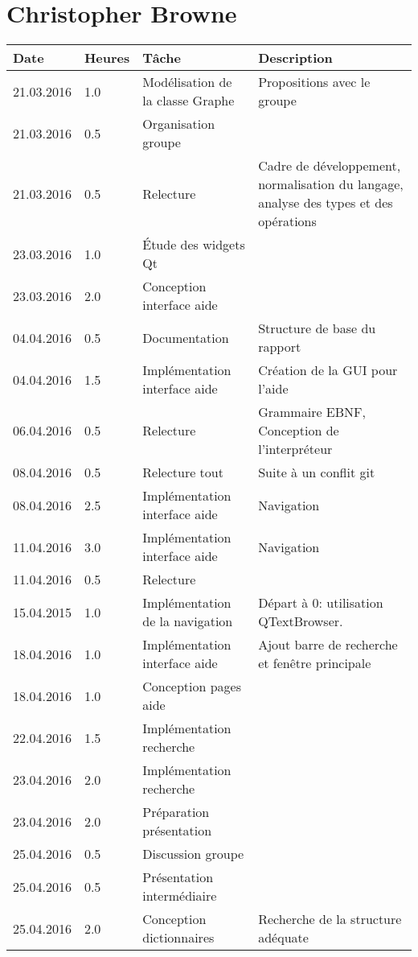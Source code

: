 \documentclass[french]{article}
\begin{document}
	\section*{Christopher Browne}
	\begin{longtable}{p{}|p{}|p{}|p{}}
		Date&Heures&Tâche&Description\\
		\hline \hline
		21.03.2016 & 1.0 & Modélisation de la classe Graphe & Propositions avec le groupe \\
		21.03.2016 & 0.5 & Organisation groupe & \\
		21.03.2016 & 0.5 & Relecture & Cadre de développement, normalisation du langage, analyse des types et des opérations \\
		23.03.2016 & 1.0 & Étude des widgets Qt & \\
		23.03.2016 & 2.0 & Conception interface aide\\
		\hline
		04.04.2016 & 0.5 & Documentation & Structure de base du rapport \\
		04.04.2016 & 1.5 & Implémentation interface aide & Création de la GUI pour l'aide \\
		06.04.2016 & 0.5 & Relecture & Grammaire EBNF, Conception de l'interpréteur\\
		08.04.2016 & 0.5 & Relecture tout & Suite à un conflit git\\
		08.04.2016 & 2.5 & Implémentation interface aide & Navigation \\
		\hline
		11.04.2016 & 3.0 & Implémentation interface aide & Navigation\\
		11.04.2016 & 0.5 & Relecture & \\
		15.04.2015 & 1.0 & Implémentation de la navigation & Départ à 0: utilisation QTextBrowser.\\
		\hline
		18.04.2016 & 1.0 & Implémentation interface aide & Ajout barre de recherche et fenêtre principale \\
		18.04.2016 & 1.0 & Conception pages aide & \\
		22.04.2016 & 1.5 & Implémentation recherche & \\
		23.04.2016 & 2.0 & Implémentation recherche & \\
		23.04.2016 & 2.0 & Préparation présentation & \\
		\hline
		25.04.2016 & 0.5 & Discussion groupe & \\
		25.04.2016 & 0.5 & Présentation intermédiaire & \\
		25.04.2016 & 2.0 & Conception dictionnaires & Recherche de la structure adéquate\\

\end{longtable}
\end{document}
